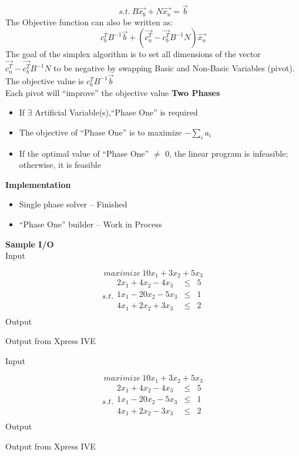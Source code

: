 \documentclass[landscape,letterpaper,pdftex]{slides}
\begin{document}
	\[s.t.\ B\vec{x_b} + N\vec{x_n} = \vec{b}\]
	\newpage
	The Objective function can also be written as:
	\[c_{b}^{T}B^{-1}\vec{b} + (\vec{c_{n}^{T}} - \vec{c_{b}^{T}}B^{-1}N)\vec{x_{n}}\]
	The goal of the simplex algorithm is to set all dimensions of the vector $\vec{c_{n}^{T}} - \vec{c_{b}^{T}}B^{-1}N$ to be negative by swapping Basic and Non-Basic Variables (pivot).\\
	The objective value is $c_{b}^{T}B^{-1}\vec{b}$\\
	Each pivot will ``improve'' the objective value
	\newpage
	\large{\textbf{Two Phases}}
	\begin{itemize}
		\item
		If $\exists$ Artificial Variable(s),``Phase One'' is required
		\item
		The objective of ``Phase One'' is to maximize $-\sum_{i}{a_i}$
		\item
		If the optimal value of ``Phase One'' $\neq$ 0, the linear program is infeasible; otherwise, it is feasible
	\end{itemize}
	\large{\textbf{Implementation}}
	\begin{itemize}
		\item
		Single phase solver -- Finished
		\item
		``Phase One'' builder -- Work in Process
	\end{itemize}
	\newpage
	
	\newpage
	
	\newpage
	\large{\textbf{Sample I/O}}\\
	Input
	
	\newpage
	\[maximize\ 10x_1 + 3x_2 + 5x_3\]
	\[s.t.\begin{array}{lcl}
	2x_1 +  4x_2 - 4x_3  &\leqslant &5\\
	1x_1 - 20x_2 - 5x_3 &\leqslant &1\\
	4x_1 +  2x_2 + 3x_3   &\leqslant &2\\
	\end{array}\]
	\newpage
	Output
	
	\newpage
	Output from Xpress IVE
	
	\newpage
	Input
	
	\newpage
	\[maximize\ 10x_1 + 3x_2 + 5x_3\]
	\[s.t.\begin{array}{lcl}
	2x_1 +  4x_2 - 4x_3  &\leqslant &5\\
	1x_1 - 20x_2 - 5x_3 &\leqslant &1\\
	4x_1 +  2x_2 - 3x_3   &\leqslant &2\\
	\end{array}\]
	\newpage
	Output
	
	\newpage
	Output from Xpress IVE
	
\end{document}

